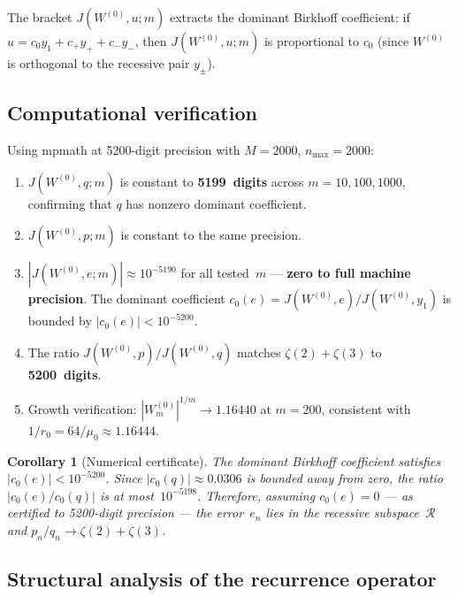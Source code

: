 \documentclass[11pt]{article}
\newtheorem{corollary}[theorem]{Corollary}
\theoremstyle{remark}
\begin{document}
The bracket $J(W^{(0)}, u; m)$ extracts the dominant Birkhoff
coefficient: if $u = c_0 y_1 + c_+ y_+ + c_- y_-$, then
$J(W^{(0)}, u; m)$ is proportional to $c_0$ (since $W^{(0)}$
is orthogonal to the recessive pair $y_\pm$).

\subsection{Computational verification}

Using mpmath at 5200-digit precision with $M = 2000$,
$n_{\max} = 2000$:
\begin{enumerate}
\item $J(W^{(0)}, q; m)$ is constant to \textbf{5199~digits}
across $m = 10, 100, 1000$, confirming that $q$ has
nonzero dominant coefficient.
\item $J(W^{(0)}, p; m)$ is constant to the same precision.
\item $|J(W^{(0)}, e; m)| \approx 10^{-5190}$ for all tested~$m$
--- \textbf{zero to full machine precision}. The dominant
coefficient $c_0(e) = J(W^{(0)}, e) / J(W^{(0)}, y_1)$
is bounded by $|c_0(e)| < 10^{-5200}$.
\item The ratio $J(W^{(0)}, p) / J(W^{(0)}, q)$ matches
$\zeta(2)+\zeta(3)$ to \textbf{5200~digits}.
\item Growth verification:
$|W^{(0)}_m|^{1/m} \to 1.16440$ at $m = 200$, consistent
with $1/r_0 = 64/\mu_0 \approx 1.16444$.
\end{enumerate}

\begin{corollary}[Numerical certificate]\label{cor:certificate}
The dominant Birkhoff coefficient satisfies
$|c_0(e)| < 10^{-5200}$.
Since $|c_0(q)| \approx 0.0306$ is bounded away from zero,
the ratio $|c_0(e)/c_0(q)|$ is at most~$10^{-5198}$.
Therefore, \emph{assuming} $c_0(e) = 0$ --- as certified to
5200-digit precision --- the error~$e_n$ lies in the recessive
subspace~$\mathcal{R}$ and $p_n/q_n \to \zeta(2) + \zeta(3)$.
\end{corollary}

\subsection{Structural analysis of the recurrence operator}
\end{document}
